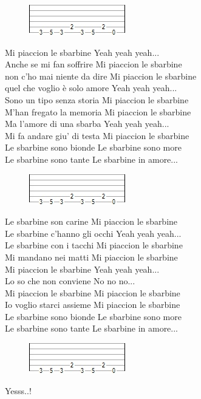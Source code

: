\documentclass[10pt, twoside, a4paper]{article}
\begin{document}
\begin{figure}[ht!]
	\includegraphics{images/temp.jpg}
\end{figure}

Mi piaccion le sbarbine			\hfill	{}Yeah yeah yeah... \\
Anche se mi fan soffrire			\hfill	Mi piaccion le sbarbine \\
non c'ho mai niente da dire		\hfill	Mi piaccion le sbarbine \\
quel che voglio è solo amore		\hfill	Yeah yeah yeah...\\

Sono un tipo senza storia		\hfill	Mi piaccion le sbarbine \\
M'han fregato la memoria			\hfill	Mi piaccion le sbarbine \\
Ma l'amore di una sbarba			\hfill	Yeah yeah yeah... \\
Mi fa andare giu' di testa		\hfill	Mi piaccion le sbarbine \\

Le sbarbine sono bionde			\hfill	Le sbarbine sono more \\
Le sbarbine sono tante			\hfill	Le sbarbine in amore... \\

\begin{figure}[ht!]
	\includegraphics{images/temp.jpg}
\end{figure}

Le sbarbine son carine			\hfill	{}Mi piaccion le sbarbine \\
Le sbarbine c'hanno gli occhi		\hfill	Yeah yeah yeah... \\
Le sbarbine con i tacchi			\hfill	Mi piaccion le sbarbine \\
Mi mandano nei matti				\hfill	Mi piaccion le sbarbine \\

Mi piaccion le sbarbine			\hfill	Yeah yeah yeah... \\
Lo so che non conviene			\hfill	No no no... \\
Mi piaccion le sbarbine			\hfill	Mi piaccion le sbarbine \\
Io voglio starci assieme			\hfill	Mi piaccion le sbarbine \\

Le sbarbine sono bionde			\hfill	Le sbarbine sono more \\
Le sbarbine sono tante			\hfill	Le sbarbine in amore... \\

\begin{figure}[ht!]
	\includegraphics{images/temp.jpg}
\end{figure}

Yesss..!
\end{document}
